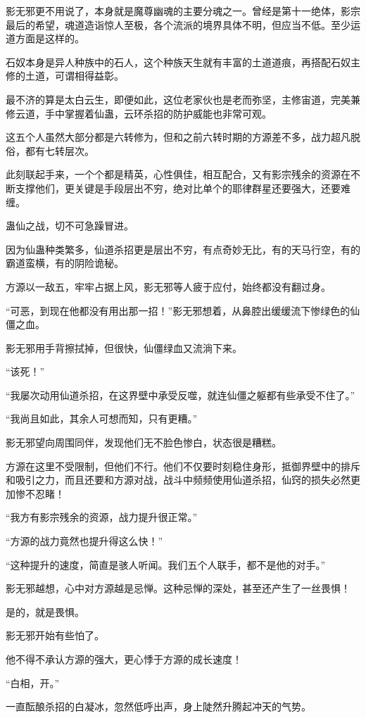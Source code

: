 \begin{this_body}
影无邪更不用说了，本身就是魔尊幽魂的主要分魂之一。曾经是第十一绝体，影宗最后的希望，魂道造诣惊人至极，各个流派的境界具体不明，但应当不低。至少运道方面是这样的。

石奴本身是异人种族中的石人，这个种族天生就有丰富的土道道痕，再搭配石奴主修的土道，可谓相得益彰。

最不济的算是太白云生，即便如此，这位老家伙也是老而弥坚，主修宙道，完美兼修云道，手中掌握着仙蛊，云环杀招的防护威能也非常可观。

这五个人虽然大部分都是六转修为，但和之前六转时期的方源差不多，战力超凡脱俗，都有七转层次。

此刻联起手来，一个个都是精英，心性俱佳，相互配合，又有影宗残余的资源在不断支撑他们，更关键是手段层出不穷，绝对比单个的耶律群星还要强大，还要难缠。

蛊仙之战，切不可急躁冒进。

因为仙蛊种类繁多，仙道杀招更是层出不穷，有点奇妙无比，有的天马行空，有的霸道蛮横，有的阴险诡秘。

方源以一敌五，牢牢占据上风，影无邪等人疲于应付，始终都没有翻过身。

“可恶，到现在他都没有用出那一招！”影无邪想着，从鼻腔出缓缓流下惨绿色的仙僵之血。

影无邪用手背擦拭掉，但很快，仙僵绿血又流淌下来。

“该死！”

“我屡次动用仙道杀招，在这界壁中承受反噬，就连仙僵之躯都有些承受不住了。”

“我尚且如此，其余人可想而知，只有更糟。”

影无邪望向周围同伴，发现他们无不脸色惨白，状态很是糟糕。

方源在这里不受限制，但他们不行。他们不仅要时刻稳住身形，抵御界壁中的排斥和吸引之力，而且还要和方源对战，战斗中频频使用仙道杀招，仙窍的损失必然更加惨不忍睹！

“我方有影宗残余的资源，战力提升很正常。”

“方源的战力竟然也提升得这么快！”

“这种提升的速度，简直是骇人听闻。我们五个人联手，都不是他的对手。”

影无邪越想，心中对方源越是忌惮。这种忌惮的深处，甚至还产生了一丝畏惧！

是的，就是畏惧。

影无邪开始有些怕了。

他不得不承认方源的强大，更心悸于方源的成长速度！

“白相，开。”

一直酝酿杀招的白凝冰，忽然低呼出声，身上陡然升腾起冲天的气势。


\end{this_body}
